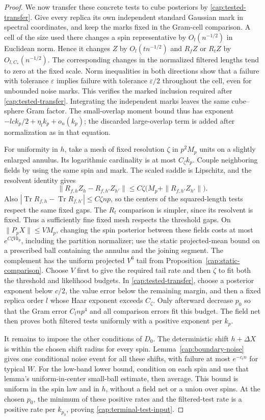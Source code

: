 \begin{proof}
We now transfer these concrete tests to cube posteriors by
\eqref{cap:tested-transfer}. Give every replica its own independent
standard Gaussian mark in spectral coordinates, and keep the marks fixed
in the Gram-cell comparison. A cell of the size used there changes a
spin representative by $O_l(n^{-1/2})$ in Euclidean norm. Hence it changes
$Z$ by $O_l(tn^{-1/2})$ and $R_fZ$ or $R_tZ$ by
$O_{l,C_*}(n^{-1/2})$. The corresponding changes in the normalized
filtered lengths tend to zero at the fixed scale. Norm inequalities in
both directions show that a failure with tolerance $\varepsilon$ implies
failure with tolerance $\varepsilon/2$ throughout the cell, even for unbounded
noise marks. This verifies the marked inclusion required after
\eqref{cap:tested-transfer}. Integrating the independent marks leaves
the same cube--sphere Gram factor. The small-overlap moment bound thus
has exponent $-lc k_p/2+\eta_l k_p+o_n(k_p)$; the discarded large-overlap
term is added after normalization as in that equation.

For uniformity in $h$, take a mesh of fixed resolution $\zeta$ in
$p^2M_p$ units on a slightly enlarged annulus. Its logarithmic cardinality
is at most $C_\zeta k_p$. Couple neighboring fields by using the same
spin and mark. The scaled saddle is Lipschitz, and the resolvent identity
gives
\[
 \|R_{f,h}Z_h-R_{f,h'}Z_{h'}\|
 \le C\zeta\bigl(M_p+\|R_{f,h'}Z_{h'}\|\bigr).
\]
Also $|\operatorname{Tr}R_{f,h}-\operatorname{Tr}R_{f,h'}|
\le C\zeta np$, so the centers of the squared-length tests respect the
same fixed gaps. The $R_t$ comparison is simpler, since its resolvent is fixed. Thus a
sufficiently fine fixed mesh respects the threshold gaps. On
$\|P_pX\|\le VM_p$, changing the spin posterior between these fields
costs at most $e^{C\zeta V k_p}$, including the partition normalizer;
use the static projected-mean bound on a prescribed ball containing the
annulus and the joining segment. The
complement has the uniform projected $V^6$ tail from
Proposition~\ref{cap:static-comparison}. Choose $V$ first to give the
required tail rate and then $\zeta$ to fit both the threshold and
likelihood budgets. In \eqref{cap:tested-transfer}, choose a posterior
exponent below $c/2$, the value error below the remaining margin, and
then a fixed replica order $l$ whose Haar exponent exceeds $C_\zeta$.
Only afterward decrease $p_0$ so that the Gram error $C_lnp^4$ and all
comparison errors fit this budget. The field net then proves both
filtered tests uniformly with a positive exponent per $k_p$.

It remains to impose the other conditions of $D_0$. The deterministic
shift $h+\Delta X$ is within the chosen shift radius for every spin.
Lemma~\ref{cap:boundary-noise} gives one conditional noise event for all
these shifts, with failure at most $e^{-c_tn}$ for typical $W$. For the
low-band lower bound, condition on each spin and use that lemma's
uniform-in-center small-ball estimate, then average. This bound is
uniform in the spin law and in $h$, without a field net or a union over
spins. At the chosen $p_0$, the minimum of these positive rates and the
filtered-test rate is a positive rate per $k_{p_0}$, proving
\eqref{cap:terminal-test-input}.


\end{proof}
